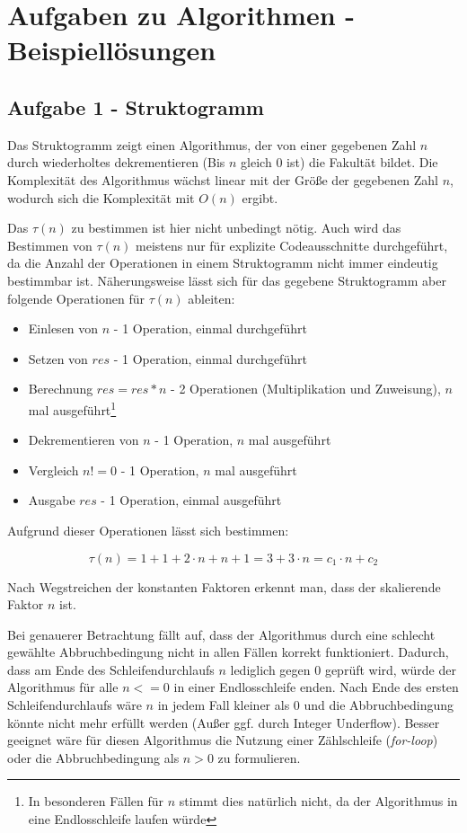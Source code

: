 \documentclass[a4paper,
			   fontsize=12pt]{article}
\begin{document}
\section*{Aufgaben zu Algorithmen - Beispiellösungen}

\vspace{0,75cm}

\subsection*{Aufgabe 1 - Struktogramm}
Das Struktogramm zeigt einen Algorithmus, der von einer gegebenen Zahl $n$ durch wiederholtes dekrementieren (Bis $n$ gleich $0$ ist) die Fakultät bildet.
Die Komplexität des Algorithmus wächst linear mit der Größe der gegebenen Zahl $n$, wodurch sich die Komplexität mit $O(n)$ ergibt.

Das $\tau(n)$ zu bestimmen ist hier nicht unbedingt nötig. Auch wird das Bestimmen von $\tau(n)$ meistens nur für explizite Codeausschnitte durchgeführt, da die 
Anzahl der Operationen in einem Struktogramm nicht immer eindeutig bestimmbar ist. Näherungsweise lässt sich für das gegebene Struktogramm aber folgende Operationen
für $\tau(n)$ ableiten:
\begin{itemize}
	\item Einlesen von $n$ - 1 Operation, einmal durchgeführt
	\item Setzen von $res$ - 1 Operation, einmal durchgeführt
	\item Berechnung $res = res*n$ - 2 Operationen (Multiplikation und Zuweisung), $n$ mal ausgeführt\footnote{In besonderen Fällen für $n$ stimmt dies natürlich nicht, da der Algorithmus in eine Endlosschleife laufen würde}
	\item Dekrementieren von $n$ - 1 Operation, $n$ mal ausgeführt
	\item Vergleich $n!=0$ - 1 Operation, $n$ mal ausgeführt
	\item Ausgabe $res$ - 1 Operation, einmal ausgeführt
\end{itemize}

Aufgrund dieser Operationen lässt sich bestimmen:

$$\tau(n)=1+1+2\cdot n+ n+ 1 = 3+3\cdot n = c_1\cdot n + c_2$$

Nach Wegstreichen der konstanten Faktoren erkennt man, dass der skalierende Faktor $n$ ist.

Bei genauerer Betrachtung fällt auf, dass der Algorithmus durch eine schlecht gewählte Abbruchbedingung nicht in allen Fällen korrekt funktioniert. Dadurch, dass
am Ende des Schleifendurchlaufs $n$ lediglich gegen $0$ geprüft wird, würde der Algorithmus für alle $n<=0$ in einer Endlosschleife enden. Nach Ende des ersten Schleifendurchlaufs
wäre $n$ in jedem Fall kleiner als $0$ und die Abbruchbedingung könnte nicht mehr erfüllt werden (Außer ggf. durch Integer Underflow). Besser geeignet wäre für diesen Algorithmus 
die Nutzung einer Zählschleife (\textit{for-loop}) oder die Abbruchbedingung als $n>0$ zu formulieren.
\end{document}
